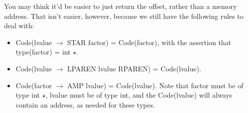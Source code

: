 \documentclass[]{article}
\theoremstyle{definition}
\begin{document}
				You may think it'd be easier to just return the offset, rather than a memory address. That isn't easier, however, because we still have the following rules to deal with:
				\begin{itemize}
					\item Code(lvalue $\to$ STAR factor) = Code(factor), with the assertion that type(factor) = int $\star$.
					\item Code(lvalue $\to$ LPAREN lvalue RPAREN) = Code(lvalue).
					\item Code(factor $\to$ AMP lvalue) = Code(lvalue). Note that factor must be of type int $\star$, lvalue must be of type int, and the Code(lvalue) will always contain an address, as needed for these types.
				\end{itemize}
\end{document}
